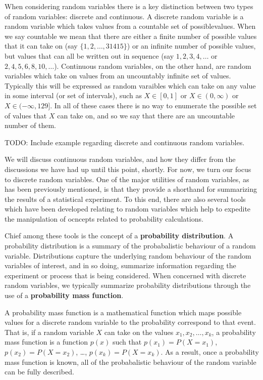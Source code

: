 \documentclass[
  letterpaper,
  DIV=11,
  numbers=noendperiod]{scrreprt}
\begin{document}
When considering random variables there is a key distinction between two
types of random variables: discrete and continuous. A discrete random
variable is a random variable which takes values from a countable set of
possiblevalues. When we say countable we mean that there are either a
finite number of possible values that it can take on (say
\(\{1,2,\dots,31415\}\)) or an infinite number of possible values, but
values that can all be written out in sequence (say \(1,2,3,4,\dots\) or
\(2,4,5,6,8,10,\dots\)). Continuous random variables, on the other hand,
are random variables which take on values from an uncountably infinite
set of values. Typically this will be expressed as random varaibles
which can take on any value in some interval (or set of intervals), such
as \(X \in [0,1]\) or \(X \in (0,\infty)\) or \(X\in (-\infty,129]\). In
all of these cases there is no way to enumerate the possible set of
values that \(X\) can take on, and so we say that there are an
uncountable number of them.

TODO: Include example regarding discrete and continuous random
variables.

We will discuss continuous random variables, and how they differ from
the discussions we have had up until this point, shortly. For now, we
turn our focus to discrete random variables. One of the major utilities
of random variables, as has been previously mentioned, is that they
provide a shorthand for summarizing the results of a statistical
experiment. To this end, there are also several tools which have been
developed relating to random variables which help to expedite the
manipulation of ocncepts related to probability calculations.

Chief among these tools is the concept of a \textbf{probability
distribution}. A probability distribution is a summary of the
probabalistic behaviour of a random variable. Distributions capture the
underlying random behaviour of the random variables of interest, and in
so doing, summarize information regarding the experiment or process that
is being considered. When concerned with discrete random variables, we
typically summarize probability distributions through the use of a
\textbf{probability mass function}.

A probability mass function is a mathematical function which maps
possible values for a discrete random variable to the probability
correspond to that event. That is, if a random variable \(X\) can take
on the values \(x_1,x_2,\dots,x_k\), a probability mass function is a
function \(p(x)\) such that \(p(x_1) = P(X = x_1)\),
\(p(x_2) = P(X = x_2)\), \ldots, \(p(x_k) = P(X=x_k)\). As a result,
once a probability mass function is known, all of the probabalistic
behaviour of the random variable can be fully described.
\end{document}
